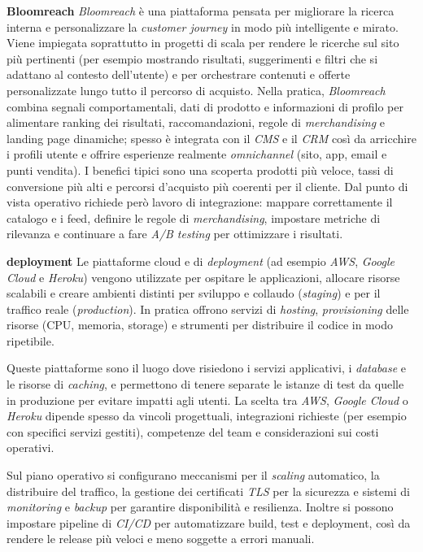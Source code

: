 \medskip
\noindent\textbf{Bloomreach}
\emph{Bloomreach} è una piattaforma pensata per migliorare la ricerca interna e personalizzare la \emph{customer journey} in modo più intelligente e mirato. 
Viene impiegata soprattutto in progetti di scala per rendere le ricerche sul sito più pertinenti (per esempio mostrando risultati, suggerimenti e filtri che si adattano al contesto dell’utente) 
e per orchestrare contenuti e offerte personalizzate lungo tutto il percorso di acquisto.
Nella pratica, \emph{Bloomreach} combina segnali comportamentali, dati di prodotto e informazioni di profilo per alimentare ranking dei risultati, raccomandazioni, 
regole di \emph{merchandising} e landing page dinamiche; spesso è integrata con il \emph{CMS} e il \emph{CRM} così da arricchire i profili utente e offrire esperienze 
realmente \emph{omnichannel} (sito, app, email e punti vendita).
I benefici tipici sono una scoperta prodotti più veloce, tassi di conversione più alti e percorsi d’acquisto più coerenti per il cliente. Dal punto di vista operativo 
richiede però lavoro di integrazione: mappare correttamente il catalogo e i feed, definire le regole di \emph{merchandising}, impostare metriche di rilevanza e 
continuare a fare \emph{A/B testing} per ottimizzare i risultati.

\medskip
\noindent\textbf{deployment}
Le piattaforme cloud e di \emph{deployment} (ad esempio \emph{AWS}, \emph{Google Cloud} e \emph{Heroku}) vengono utilizzate per ospitare le applicazioni, 
allocare risorse scalabili e creare ambienti distinti per sviluppo e collaudo (\emph{staging}) e per il traffico reale (\emph{production}). 
In pratica offrono servizi di \emph{hosting}, \emph{provisioning} delle risorse (CPU, memoria, storage) e strumenti per distribuire il codice in modo ripetibile.

Queste piattaforme sono il luogo dove risiedono i servizi applicativi, i \emph{database} e le risorse di \emph{caching}, 
e permettono di tenere separate le istanze di test da quelle in produzione per evitare impatti agli utenti. La scelta tra \emph{AWS}, \emph{Google Cloud} o \emph{Heroku} 
dipende spesso da vincoli progettuali, integrazioni richieste (per esempio con specifici servizi gestiti), competenze del team e considerazioni sui costi operativi.

Sul piano operativo si configurano meccanismi per il \emph{scaling} automatico, la distribuire del traffico, 
la gestione dei certificati \emph{TLS} per la sicurezza e sistemi di \emph{monitoring} e \emph{backup} per garantire disponibilità e resilienza. 
Inoltre si possono impostare pipeline di \emph{CI/CD} per automatizzare build, test e deployment, così da rendere le release più veloci e meno soggette a errori manuali.

